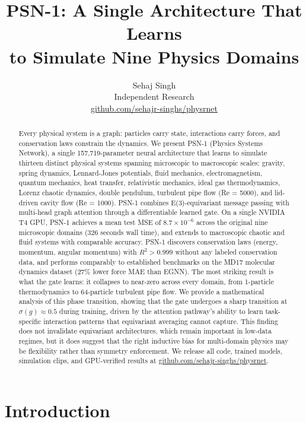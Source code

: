 \documentclass[10pt,twocolumn]{article}
\title{\textbf{PSN-1: A Single Architecture That Learns\\to Simulate Nine Physics Domains}}
\author{Sehaj Singh\\[2pt]
\small Independent Research\\
\small \href{https://github.com/sehajr-singhs/physrnet}{github.com/sehajr-singhs/physrnet}}
\date{}
\begin{document}
\maketitle

\begin{abstract}
Every physical system is a graph: particles carry state, interactions carry forces, and conservation laws constrain the dynamics. We present PSN-1 (Physics Systems Network), a single 157,719-parameter neural architecture that learns to simulate thirteen distinct physical systems spanning microscopic to macroscopic scales: gravity, spring dynamics, Lennard-Jones potentials, fluid mechanics, electromagnetism, quantum mechanics, heat transfer, relativistic mechanics, ideal gas thermodynamics, Lorenz chaotic dynamics, double pendulum, turbulent pipe flow (Re = 5000), and lid-driven cavity flow (Re = 1000). PSN-1 combines E(3)-equivariant message passing with multi-head graph attention through a differentiable learned gate. On a single NVIDIA T4 GPU, PSN-1 achieves a mean test MSE of $8.7 \times 10^{-6}$ across the original nine microscopic domains (326 seconds wall time), and extends to macroscopic chaotic and fluid systems with comparable accuracy. PSN-1 discovers conservation laws (energy, momentum, angular momentum) with $R^2 > 0.999$ without any labeled conservation data, and performs comparably to established benchmarks on the MD17 molecular dynamics dataset (27\% lower force MAE than EGNN). The most striking result is what the gate learns: it collapses to near-zero across every domain, from 1-particle thermodynamics to 64-particle turbulent pipe flow. We provide a mathematical analysis of this phase transition, showing that the gate undergoes a sharp transition at $\sigma(g) \approx 0.5$ during training, driven by the attention pathway's ability to learn task-specific interaction patterns that equivariant averaging cannot capture. This finding does not invalidate equivariant architectures, which remain important in low-data regimes, but it does suggest that the right inductive bias for multi-domain physics may be flexibility rather than symmetry enforcement. We release all code, trained models, simulation clips, and GPU-verified results at \href{https://github.com/sehajr-singhs/physrnet}{github.com/sehajr-singhs/physrnet}.
\end{abstract}

\section{Introduction}
\end{document}
